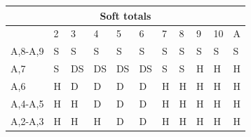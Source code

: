 \documentclass[conference]{IEEEtran}
\begin{document}
\begin{table}[ht]
\begin{tabular}{|l|l|l|l|l|l|l|l|l|l|l|}
\multicolumn{11}{|c|}{\textbf{Soft totals}}                           \\ \hline
                             & 2 & 3 & 4 & 5 & 6 & 7 & 8 & 9 & 10 & A \\ \hline
A,8-A,9                      & \cellcolor{red!75}S & \cellcolor{red!75}S & \cellcolor{red!75}S & \cellcolor{red!75}S & \cellcolor{red!75}S & \cellcolor{red!75}S & \cellcolor{red!75}S & \cellcolor{red!75}S & \cellcolor{red!75}S & \cellcolor{red!75}S  \\ \hline
A,7                          & \cellcolor{red!75}S & \cellcolor{blue!25}DS & \cellcolor{blue!25}DS & \cellcolor{blue!25}DS & \cellcolor{blue!25}DS & \cellcolor{red!75}S & \cellcolor{red!75}S & \cellcolor{green!50}H & \cellcolor{green!50}H & \cellcolor{green!50}H  \\ \hline
A,6                          & \cellcolor{green!50}H & \cellcolor{blue!25}D & \cellcolor{blue!25}D & \cellcolor{blue!25}D & \cellcolor{blue!25}D & \cellcolor{green!50}H & \cellcolor{green!50}H & \cellcolor{green!50}H & \cellcolor{green!50}H & \cellcolor{green!50}H  \\ \hline
A,4-A,5                      & \cellcolor{green!50}H & \cellcolor{green!50}H & \cellcolor{blue!25}D & \cellcolor{blue!25}D & \cellcolor{blue!25}D & \cellcolor{green!50}H & \cellcolor{green!50}H & \cellcolor{green!50}H & \cellcolor{green!50}H & \cellcolor{green!50}H  \\ \hline
A,2-A,3                      & \cellcolor{green!50}H & \cellcolor{green!50}H & \cellcolor{green!50}H & \cellcolor{blue!25}D & \cellcolor{blue!25}D & \cellcolor{green!50}H & \cellcolor{green!50}H & \cellcolor{green!50}H & \cellcolor{green!50}H & \cellcolor{green!50}H  \\ \hline \hline


\end{tabular}
\end{table}
\end{document}
